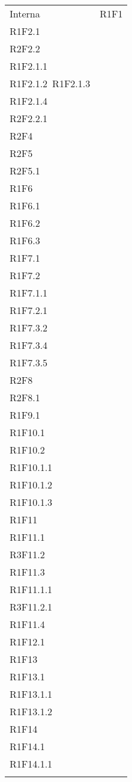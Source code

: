 \begin{longtable}{|C{6.5cm}|C{6.5cm}|}
	Interna & 
	\centering
	R1F1\\
	R1F2.1 \\
	R2F2.2\\
	R1F2.1.1\\
	R1F2.1.2\
	R1F2.1.3\\
	R1F2.1.4\\
	R2F2.2.1\\
	R2F4\\
	R2F5\\
	R2F5.1\\
	R1F6\\
	R1F6.1\\
	R1F6.2\\
	R1F6.3\\
	R1F7.1\\
	R1F7.2\\
	R1F7.1.1\\
	R1F7.2.1\\
	R1F7.3.2\\
	R1F7.3.4\\
	R1F7.3.5\\
	R2F8\\
	R2F8.1\\
	R1F9.1\\
	R1F10.1\\
	R1F10.2\\
	R1F10.1.1\\
	R1F10.1.2\\
	R1F10.1.3\\
	R1F11\\
	R1F11.1\\
	R3F11.2\\
	R1F11.3\\
	R1F11.1.1\\
	R3F11.2.1\\
	R1F11.4\\
	R1F12.1\\	
	R1F13\\
	R1F13.1\\
	R1F13.1.1\\
	R1F13.1.2\\
	R1F14\\
	R1F14.1\\
	R1F14.1.1\\
	
	\tabularnewline
	

\end{longtable}
